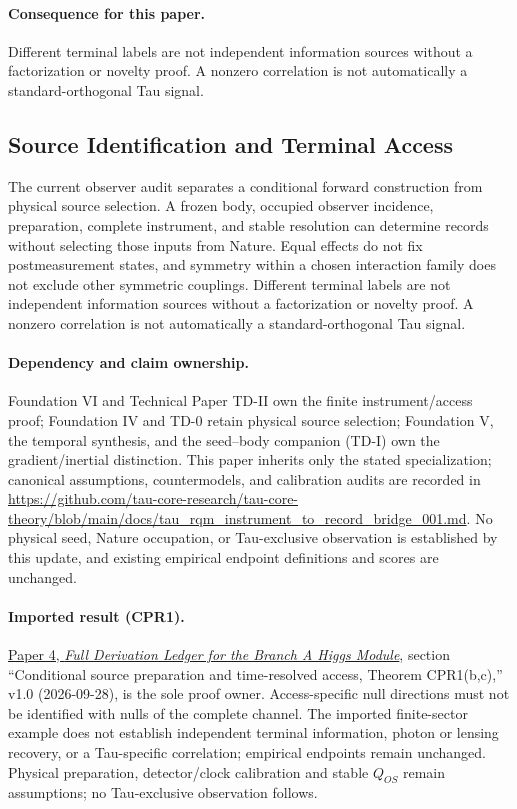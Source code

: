 \documentclass[11pt]{article}
\begin{document}
\paragraph{Consequence for this paper.}
Different terminal labels are not independent information sources without a
factorization or novelty proof. A nonzero correlation is not automatically a
standard-orthogonal Tau signal.

\subsection{Source Identification and Terminal Access}
The current observer audit separates a conditional forward construction from
physical source selection. A frozen body, occupied observer incidence,
preparation, complete instrument, and stable resolution can determine records
without selecting those inputs from Nature. Equal effects do not fix
postmeasurement states, and symmetry within a chosen interaction family does
not exclude other symmetric couplings. Different terminal labels are not
independent information sources without a factorization or novelty proof. A
nonzero correlation is not automatically a standard-orthogonal Tau signal.

\paragraph{Dependency and claim ownership.}
Foundation VI and Technical Paper TD-II own the finite instrument/access proof;
Foundation IV and TD-0 retain physical source selection; Foundation V, the
temporal synthesis, and the seed--body companion (TD-I) own the
gradient/inertial distinction. This paper inherits only the stated
specialization; canonical assumptions, countermodels, and calibration audits are
recorded in
\url{https://github.com/tau-core-research/tau-core-theory/blob/main/docs/tau_rqm_instrument_to_record_bridge_001.md}.
No physical seed, Nature occupation, or Tau-exclusive observation is established
by this update, and existing empirical endpoint definitions and scores are
unchanged.

\paragraph{Imported result (CPR1).}
\href{https://github.com/tau-core-research/tau-core-higgs-module-paper4/blob/main/paper4_full_derivation/full_derivation.pdf#nameddest=cpr1}{Paper 4, \emph{Full Derivation Ledger for the Branch A Higgs Module}}, section ``Conditional source preparation and time-resolved access, Theorem CPR1(b,c),'' v1.0 (2026-09-28), is the sole proof owner.
Access-specific null directions must not be identified with nulls of the complete channel. The imported finite-sector example does not establish independent terminal information, photon or lensing recovery, or a Tau-specific correlation; empirical endpoints remain unchanged.
Physical preparation, detector/clock calibration and stable $Q_{OS}$ remain assumptions; no Tau-exclusive observation follows.
\end{document}
